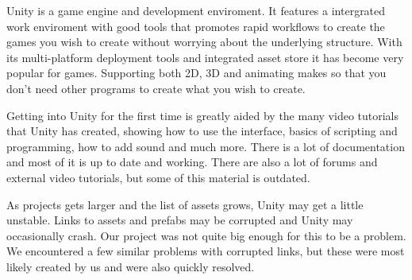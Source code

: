 
Unity is a game engine and development enviroment.
It features a intergrated work enviroment with good tools that promotes rapid workflows to create the games you wish to create without worrying about the underlying structure.
With its multi-platform deployment tools and integrated asset store it has become very popular for games.
Supporting both 2D, 3D and animating makes so that you don't need other programs to create what you wish to create.

Getting into Unity for the first time is greatly aided by the many video tutorials that Unity has created, showing how to use the interface, basics of scripting and programming, how to add sound and much more. There is a lot of documentation and most of it is up to date and working. There are also a lot of forums and external video tutorials, but some of this material is outdated.

As projects gets larger and the list of assets grows, Unity may get a little unstable. Links to assets and \gls{prefab}s may be corrupted and Unity may occasionally crash. Our project was not quite big enough for this to be a problem. We encountered a few similar problems with corrupted links, but these were most likely created by us and were also quickly resolved. 

